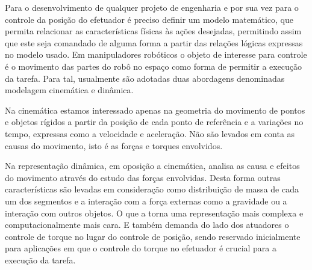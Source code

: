 Para o desenvolvimento de qualquer projeto de engenharia e por sua vez para o controle da posição do efetuador é preciso definir um modelo matemático, que permita relacionar as características físicas às ações desejadas, permitindo assim que este seja comandado de alguma forma a partir das relações lógicas expressas no modelo usado. Em manipuladores robóticos o objeto de interesse para controle é o movimento das partes do robô no espaço como forma de permitir a execução da tarefa. Para tal, usualmente são adotadas duas abordagens denominadas modelagem cinemática e dinâmica.

Na cinemática estamos interessado apenas na geometria do movimento de pontos e objetos rígidos a partir da posição de cada ponto de referência e a variações no tempo, expressas como a velocidade e aceleração. Não são levados em conta as causas do movimento, isto é as forças e torques envolvidos.


Na representação dinâmica, em oposição a cinemática, analisa as causa e efeitos do movimento através do estudo das forças envolvidas. Desta forma outras características são levadas em consideração como distribuição de massa de cada um dos segmentos e a interação com a força externas como a gravidade ou a interação com outros objetos. O que a torna uma representação mais complexa e computacionalmente mais cara. E também demanda do lado dos atuadores o controle de torque no lugar do controle de posição, sendo reservado inicialmente para aplicações em que o controle do torque no efetuador é crucial para a execução da tarefa.



